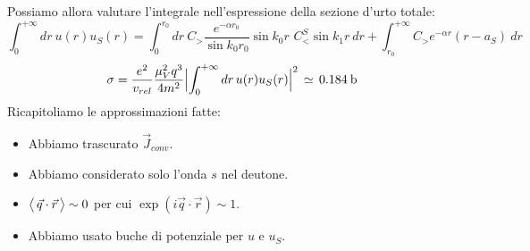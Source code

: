 Possiamo allora valutare l'integrale nell'espressione della sezione d'urto totale:
$$\int_0^{+\infty} dr \: u(r)u_S(r) = \int_0^{r_0} dr\: C_> \frac{e^{-\alpha r_0}}{\sin{k_0r_0}}\sin{k_0r}\,\, C_<^S \sin{k_1r}\:dr + \int_{r_0}^{+\infty} C_> e^{-\alpha r}(r-a_S) \: dr$$
$$\sigma = \frac{e^2}{v_{rel}}\frac{\mu^2_V q^3}{4m^2} \Bigl |\int_0^{+\infty} dr \, u(r) u_S(r)\Bigr |^2 \,\simeq\, 0.184\:\mbox{b}$$
Ricapitoliamo le approssimazioni fatte:
\begin{itemize}
    \item Abbiamo trascurato $\vec{J}_{conv}$.
    \item Abbiamo considerato solo l'onda $s$ nel deutone.
    \item $\bigl\langle\, \vec{q}\cdot\vec{r}\, \bigr\rangle\sim 0$ per cui $\exp{(i\vec{q}\cdot\vec{r})}\sim 1$.
    \item Abbiamo usato buche di potenziale per $u$ e $u_S$.
\end{itemize}
